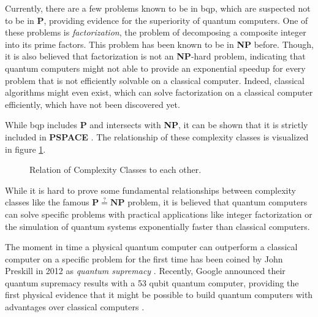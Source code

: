 Currently, there are a few problems known to be in \gls{bqp}, which are suspected not to be in \textbf{P}, providing evidence for the superiority of quantum computers. One
of these problems is \textit{factorization}, the problem of decomposing a
composite integer into its prime factors. This problem has been known to be in
\textbf{NP} before. Though, it is also believed that factorization is not an \textbf{NP}-hard problem, indicating that quantum computers might not able to provide
an exponential speedup for every problem that is not efficiently solvable on a
classical computer. Indeed, classical algorithms might even exist, which can
solve factorization on a classical computer efficiently, which have not been
discovered yet.

While \gls{bqp} includes \textbf{P} and intersects with \textbf{NP}, it can be shown that it is strictly
included in \textbf{PSPACE} \cite{Bernstein93quantumcomplexity}. The relationship of these complexity classes is visualized
in figure \ref{fig:complexityclasses}.

\begin{figure}[H]
  \centering
  \caption[Relation of Complexity Classes to Each Other]{Relation of Complexity Classes to each other.}
  \label{fig:complexityclasses}
\end{figure}

While it is hard to prove some fundamental relationships between complexity
classes like the famous $\mathbf{P} \stackrel{?}{=} \mathbf{NP}$ problem, it is believed that quantum computers
can solve specific problems with practical applications like integer factorization \cite{shor1997factorisation} or the simulation of
quantum systems \cite{feynman1982simulating} exponentially faster than classical computers.

The moment
in time a physical quantum computer can outperform a classical computer
on a specific problem for the first time has been coined by John Preskill in
2012 as \textit{quantum supremacy} \cite{preskill2012quantum}. Recently, Google announced their quantum
supremacy results with a 53 qubit quantum computer, providing the first physical evidence that it
might be possible to build quantum computers with advantages over classical
computers \cite{martines2019supremacy}.